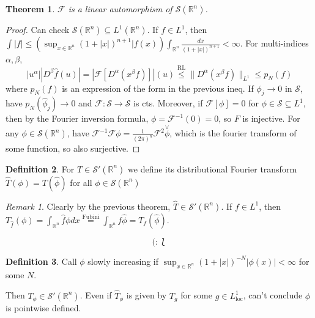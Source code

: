 \documentclass{article}
\theoremstyle{definition}
\newtheorem{defn}{Definition}[section]
\theoremstyle{remark}
\newtheorem{rem}{Remark}
\theoremstyle{plain}
\newtheorem{thm}[defn]{Theorem}
\newcommand{\RR}{\mathbb{R}}
\begin{document}
\begin{thm}
    $\mathcal F$ is a linear automorphism of $\mathcal S(\RR^n)$.
\end{thm}
\begin{proof}
    Can check $\mathcal S(\RR^n)\subseteq L^1(\RR^n)$. If $f\in L^1$, then $\int|f|\le (\sup_{x\in\RR^n}(1+|x|)^{n+1}|f(x))\int_{\RR^n}\frac{dx}{(1+|x|)^{n+1}}<\infty$.
    For multi-indices $\alpha,\beta$,
    \[|u^\alpha||D^\beta\hat f(u)|=|\mathcal F[D^\alpha(x^\beta f)]|(u)\overset{\text{RL}}{\le}\|D^\alpha(x^\beta f)\|_{L^1}\le p_N(f)\] where $p_N(f)$ is an expression of the form in the previous ineq. If $\phi_j\to 0$ in $\mathcal S$, have $p_N(\hat \phi_j)\to 0$ and $\mathcal F:\mathcal S\to \mathcal S$ is cts. Moreover, if $\mathcal F[\phi]=0$ for $\phi\in\mathcal S\subseteq L^1$, then by the Fourier inversion formula, $\phi=\mathcal F^{-1}(0)=0$, so $F$ is injective. For any $\phi\in \mathcal S(\RR^n)$, have $\mathcal F^{-1}\mathcal F\phi=\frac{1}{(2\pi)^n}\mathcal F^2\overset{\vee}{\phi}$, which is the fourier transform of some function, so also surjective.
\end{proof}

\begin{defn}
    For $T\in \mathcal S'(\RR^n)$ we define its distributional Fourier transform $\hat T(\phi)=T(\hat\phi)$ for all $\phi\in\mathcal S(\RR^n)$
\end{defn}
\begin{rem}
    Clearly by the previous theorem, $\hat T\in \mathcal S'(\RR^n)$. If $f\in L^1$, then $T_{\hat f}(\phi)=\int_{\RR^n}\hat f\phi dx\overset{\text{Fubini}}{=}\int_{\RR^n}f\hat\phi= T_f(\hat\phi)$.
\end{rem}
\[(:\Lbag\tag{Owen's Signature with Quiff}\]
\begin{defn}
    Call $\phi$ slowly increasing if $\sup_{x\in\RR^n}(1+|x|)^{-N}|\phi(x)|<\infty$ for some $N$.
\end{defn}
Then $T_\phi\in\mathcal S'(\RR^n)$. Even if $\hat T_\phi$ is given by $T_g$ for some $g\in L^1_{\text{loc}}$, can't conclude $\hat\phi$ is pointwise defined.
\end{document}
